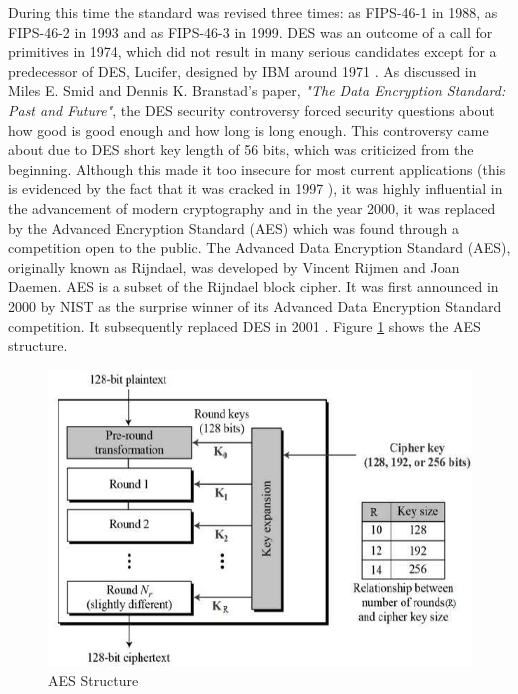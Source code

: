 \documentclass[journal]{IEEEtran}
\begin{document}
During this time the standard was revised three times: as FIPS-46-1 in 1988, as FIPS-46-2 in 1993 and as FIPS-46-3 in 1999. DES was an outcome of a call for primitives in 1974, which did not result in many serious candidates except for a predecessor of DES, Lucifer, designed by IBM around 1971 \cite{des}. As discussed in Miles E. Smid and Dennis K. Branstad's paper, \textit{"The Data Encryption Standard: Past and Future"}, the DES security controversy \cite{des_past&future} forced security questions about how good is good enough and how long is long enough. This controversy came about due to DES short key length of 56 bits, which was criticized from the beginning. Although this made it too insecure for most current applications (this is evidenced by the fact that it was cracked in 1997 \cite{des_cracked}), it was highly influential in the advancement of modern cryptography \cite{des_overview} and in the year 2000, it was replaced by the Advanced Encryption Standard (AES) which was found through a competition open to the public.
\newline\newline
The Advanced Data Encryption Standard (AES), originally known as Rijndael, was developed by Vincent Rijmen and Joan Daemen. AES is a subset of the Rijndael block cipher. It was first announced in 2000 by NIST as the surprise winner \cite{aes} of its Advanced Data Encryption Standard competition. It subsequently replaced DES in 2001 \cite{encryption_study}. Figure \ref{fig:aes} shows the AES structure.

\newline
\begin{figure}[!h]
    \centering
    \includegraphics[scale=.4]{aes_structure}
    \caption{AES Structure}
    \label{fig:aes}
\end{figure}
\end{document}
